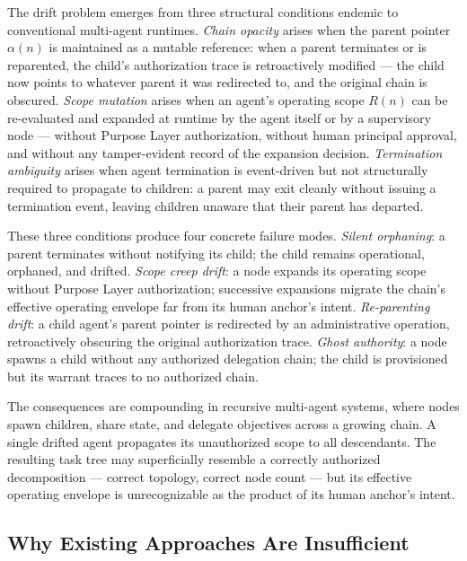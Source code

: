 The drift problem emerges from three structural conditions endemic to conventional multi-agent runtimes. \emph{Chain opacity} arises when the parent pointer $\alpha(n)$ is maintained as a mutable reference: when a parent terminates or is reparented, the child's authorization trace is retroactively modified --- the child now points to whatever parent it was redirected to, and the original chain is obscured. \emph{Scope mutation} arises when an agent's operating scope $R(n)$ can be re-evaluated and expanded at runtime by the agent itself or by a supervisory node --- without Purpose Layer authorization, without human principal approval, and without any tamper-evident record of the expansion decision. \emph{Termination ambiguity} arises when agent termination is event-driven but not structurally required to propagate to children: a parent may exit cleanly without issuing a termination event, leaving children unaware that their parent has departed.

These three conditions produce four concrete failure modes. \emph{Silent orphaning}: a parent terminates without notifying its child; the child remains operational, orphaned, and drifted. \emph{Scope creep drift}: a node expands its operating scope without Purpose Layer authorization; successive expansions migrate the chain's effective operating envelope far from its human anchor's intent. \emph{Re-parenting drift}: a child agent's parent pointer is redirected by an administrative operation, retroactively obscuring the original authorization trace. \emph{Ghost authority}: a node spawns a child without any authorized delegation chain; the child is provisioned but its warrant traces to no authorized chain.

The consequences are compounding in recursive multi-agent systems, where nodes spawn children, share state, and delegate objectives across a growing chain. A single drifted agent propagates its unauthorized scope to all descendants. The resulting task tree may superficially resemble a correctly authorized decomposition --- correct topology, correct node count --- but its effective operating envelope is unrecognizable as the product of its human anchor's intent.

\subsection{Why Existing Approaches Are Insufficient}

